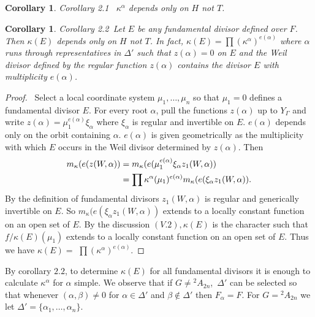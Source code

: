 \documentclass{memo-l}
\newtheorem{corollary}[theorem]{Corollary}
\theoremstyle{definition}
\theoremstyle{remark}
\numberwithin{section}{chapter}
\numberwithin{equation}{chapter}
\begin{document}
\medpagebreak

\begin{corollary}{Corollary 2.1 }\  ${\kappa}^{{\alpha}}$ depends only on $H$ not
$T$.
\end{corollary}

\begin{corollary}{Corollary 2.2}\ Let $E$ be {\it any} fundamental divisor defined
over $F$.  Then ${\kappa}(E)$ depends only on $H$ not $T$.  In fact,
${\kappa}(E)  =  \prod({\kappa}^\alpha)^{e(\alpha)}$ where ${\alpha}$
runs through representatives in ${\Delta}'$ such that $z({\alpha}) = 0$ on
$E$ and the Weil divisor defined by the regular function $z({\alpha})$
contains the divisor $E$ with multiplicity $e({\alpha})$.
\end{corollary}

\begin{proof} \ Select a local coordinate system ${\mu}_{1},\ldots ,{\mu}_{n}$ 
so that ${\mu}_{1} = 0$ defines a fundamental divisor $E$.  For every
root ${\alpha}$, pull the functions $z({\alpha})$ up to $Y_{{\Gamma}}$ and
write $z({\alpha})  =  {\mu}_{1}^{e({\alpha})}{\xi}_{{\alpha}}$ where
${\xi}_{{\alpha}}$ is regular and invertible on $E$.  $e({\alpha})$ depends
only on the orbit containing ${\alpha}$.  $e({\alpha})$ is given
geometrically as the multiplicity with which $E$ occurs in the Weil divisor
determined by $z({\alpha})$.  Then
$$
\aligned
m_{{\kappa}}(e(z(W,{\alpha}))  &= 
m_{{\kappa}}(e({\mu}_{1}^{e({\alpha})}{\xi}_{{\alpha}}z_{1}(W,{\alpha})) \\ 
&= \prod{\kappa}^{{\alpha}}({\mu}_{1})^{e({\alpha})}m_{{\kappa}}(e({\xi}_{{\alpha}}z_{1}(W,{\alpha})).
\endaligned
$$
By the definition of fundamental divisors $z_{1}(W,{\alpha})$ is regular and
generically invertible on $E$.  So
$m_{{\kappa}}(e({\xi}_{{\alpha}}z_{1}(W,{\alpha}))$ extends to a locally
constant function on an open set of $E$.  By the discussion $(V.2),
{\kappa}(E)$ is the character such that $f/{\kappa}(E)({\mu}_{1})$ extends
to a locally constant function on an open set of $E$.  Thus we have
${\kappa}(E)  = $ $\prod({\kappa}^{{\alpha}})^{e({\alpha})}$.
\end{proof} 

{\medskip}

   By corollary $2.2$, to determine ${\kappa}(E)$ for all fundamental divisors it
is enough to calculate ${\kappa}^{{\alpha}}$ for ${\alpha}$ simple.  We
observe that if $G \ne {{}^{2}A_{2n}}$,\  ${\Delta}'$ can be selected so that
whenever $({\alpha},{\beta}) \ne 0$ for ${\alpha}  \in  {\Delta}'$ and
${\beta} {\notin} {\Delta}'$ then $F_{{\alpha}} = F$.  For $G = {{}^{2}A_{2n}}$ we
let ${\Delta}' = \{{\alpha}_{1},\ldots ,{\alpha}_{n}\}$.  
\end{document}
